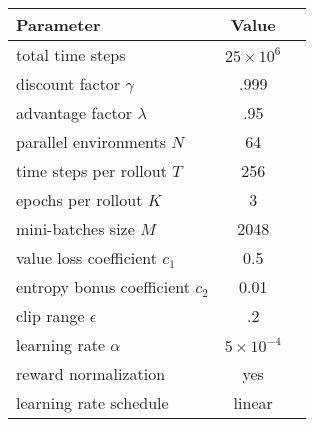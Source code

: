 \begin{tabular}{lcc}
    \toprule
    Parameter & Value \\
    \midrule
    total time steps & \(25 \times 10^6\) \\
    discount factor \(\gamma\) & .999 \\
    advantage factor \(\lambda\) & .95 \\
    parallel environments \(N\) & 64 \\
    time steps per rollout \(T\) & 256 \\
    epochs per rollout \(K\) & 3 \\
    mini-batches size \({M}\) & 2048 \\
    value loss coefficient \(c_1\) & 0.5 \\
    entropy bonus coefficient \(c_2\) & 0.01 \\
    clip range \(\epsilon\) & .2 \\
    learning rate \(\alpha\) & \(5 \times 10^{-4}\) \\
    reward normalization & yes \\
    learning rate schedule & linear \\
    \bottomrule
\end{tabular}